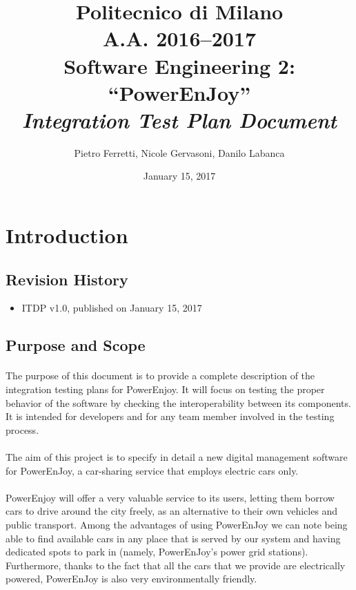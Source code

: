 \documentclass[english]{article}
\begin{document}
\title{Politecnico di Milano\\
 A.A. 2016–2017 \\
Software Engineering 2: “PowerEnJoy” \\
\emph{Integration Test Plan Document}}

\author{Pietro Ferretti, Nicole Gervasoni, Danilo Labanca}
\date{January 15, 2017}
\maketitle

\newpage

\tableofcontents{}

\newpage

\section{Introduction}

\subsection{Revision History}
\begin{itemize}
	\item{ITDP v1.0, published on January 15, 2017}
\end{itemize}
\subsection{Purpose and Scope}

\paragraph{}
The purpose of this document is to provide a complete description of the integration testing plans for PowerEnjoy. It will focus on testing the proper behavior of the software by checking the 
interoperability between its components.
It is intended for developers and for any team member involved in the testing process.

\paragraph{}
The aim of this project is to specify in detail a new digital management software for PowerEnJoy, a car-sharing service that employs electric cars only.

\paragraph{}
PowerEnjoy will offer a very valuable service to its users, letting them borrow cars to drive around the city freely, as an alternative to their own vehicles and public transport.
Among the advantages of using PowerEnJoy we can note being able to find available cars in any place that is served by our system and having dedicated spots to park in (namely, PowerEnJoy's power grid stations).
Furthermore, thanks to the fact that all the cars that we provide are electrically powered, PowerEnJoy is also very environmentally friendly.
\end{document}
